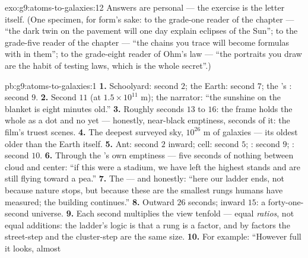 \begin{solution}{exo:g9:atoms-to-galaxies:12}
Answers are personal --- the exercise is the letter itself.
(One specimen, for form's sake: to the grade-one reader of
the  chapter --- ``the dark twin on the pavement
will one day explain eclipses of the Sun''; to the
grade-five reader of the  chapter --- ``the chains
you trace will become formulas with  in them''; to
the grade-eight reader of Ohm's law --- ``the portraits you
draw are the habit of testing laws, which is the whole
secret''.)
\end{solution}

\begin{solution}{pb:g9:atoms-to-galaxies:1}
\textbf{1.} Schoolyard: second $2$; the Earth: second $7$;
the 's : second $9$.
\textbf{2.} Second $11$ (at $1.5 \times 10^{11}$ \unit{m});
the narrator: ``the sunshine on the blanket is eight
minutes old.''
\textbf{3.} Roughly seconds $13$ to $16$: the frame holds
the whole  as a dot and no  yet ---
honestly, near-black emptiness, seconds of it: the film's
truest scenes.
\textbf{4.} The deepest surveyed sky, $10^{26}$ \unit{m} of
galaxies --- its oldest  older than the Earth itself.
\textbf{5.} Ant: second $2$ inward; cell: second $5$;
: second $9$; : second $10$.
\textbf{6.} Through the 's own emptiness --- five
seconds of nothing between cloud and center: ``if this 
were a stadium, we have left the highest stands and are
still flying toward a pea.''
\textbf{7.} The  --- and honestly: ``here our ladder
ends, not because nature stops, but because these are the
smallest rungs humans have measured; the building
continues.''
\textbf{8.} Outward $26$ seconds; inward $15$: a
forty-one-second universe.
\textbf{9.} Each second multiplies the view tenfold ---
equal \emph{ratios}, not equal additions: the ladder's
logic is that a rung is a factor, and by factors the
street-step and the cluster-step are the same size.
\textbf{10.} For example: ``However full it looks, almost

\end{solution}
